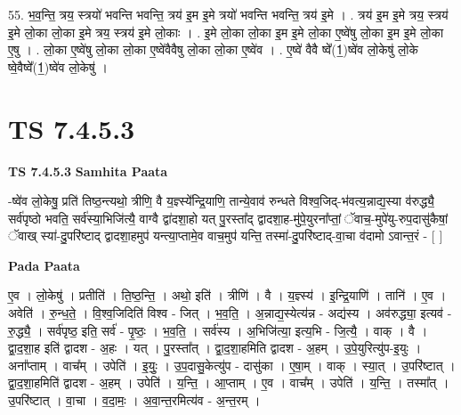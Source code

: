 \documentclass[17pt]{extarticle}
\begin{document}
55. भ॒व॒न्ति॒ त्रय॒ स्त्रयो॑ भवन्ति भवन्ति॒ त्रय॑ इ॒म इ॒मे त्रयो॑ भवन्ति भवन्ति॒ त्रय॑ इ॒मे । . त्रय॑ इ॒म इ॒मे त्रय॒ स्त्रय॑ इ॒मे लो॒का लो॒का इ॒मे त्रय॒ स्त्रय॑ इ॒मे लो॒काः । . इ॒मे लो॒का लो॒का इ॒म इ॒मे लो॒का ए॒ष्वे॑षु लो॒का इ॒म इ॒मे लो॒का ए॒षु । . लो॒का ए॒ष्वे॑षु लो॒का लो॒का ए॒ष्वे॑वैवैषु लो॒का लो॒का ए॒ष्वे॑व । . ए॒ष्वे॑ वैवै ष्वे᳚(1॒)ष्वे॑व लो॒केषु॑ लो॒के ष्वे॒वैष्वे᳚(1॒)ष्वे॑व लो॒केषु॑ । \newline
\pagebreak
{}

\section{ TS 7.4.5.3 }

\textbf{TS 7.4.5.3 } \newline
\textbf{Samhita Paata} \newline

-ष्वे॑व लो॒केषु॒ प्रति॑ तिष्ठ॒न्त्यथो॒ त्रीणि॒ वै य॒ज्ञ्स्ये᳚न्द्रि॒याणि॒ तान्ये॒वाव॑ रुन्धते विश्व॒जिद्-भ॑वत्य॒न्नाद्य॒स्या व॑रुद्ध्यै॒ सर्व॑पृष्ठो भवति॒ सर्व॑स्या॒भिजि॑त्यै॒ वाग्वै द्वा॑दशा॒हो यत् पु॒रस्ता᳚द् द्वादशा॒ह-मु॑पे॒युरना᳚प्तां॒ ॅवाच॒-मुपे॑यु-रुप॒दासु॑कैषां॒ ॅवाख् स्या॑-दु॒परि॑ष्टाद् द्वादशा॒हमुप॑ यन्त्या॒प्तामे॒व वाच॒मुप॑ यन्ति॒ तस्मा॑-दु॒परि॑ष्टाद्-वा॒चा व॑दामो ऽवान्त॒रं - [  ] \newline

\textbf{Pada Paata} \newline

ए॒व । लो॒केषु॑ । प्रतीति॑ । ति॒ष्ठ॒न्ति॒ । अथो॒ इति॑ । त्रीणि॑ । वै । य॒ज्ञ्स्य॑ । इ॒न्द्रि॒याणि॑ । तानि॑ । ए॒व । अवेति॑ । रु॒न्ध॒ते॒ । वि॒श्व॒जिदिति॑ विश्व - जित् । भ॒व॒ति॒ । अ॒न्नाद्य॒स्येत्य॑न्न - अद्य॑स्य । अव॑रुद्ध्या॒ इत्यव॑ - रु॒द्ध्यै॒ । सर्व॑पृष्ठ॒ इति॒ सर्व॑ - पृ॒ष्ठः॒ । भ॒व॒ति॒ । सर्व॑स्य । अ॒भिजि॑त्या॒ इत्य॒भि - जि॒त्यै॒ । वाक् । वै । द्वा॒द॒शा॒ह इति॑ द्वादश - अ॒हः । यत् । पु॒रस्ता᳚त् । द्वा॒द॒शा॒हमिति द्वादश - अ॒हम् । उ॒पे॒युरित्यु॑प-इ॒युः । अना᳚प्ताम् । वाच᳚म् । उपेति॑ । इ॒युः॒ । उ॒प॒दासु॒केत्यु॑प - दासु॑का । ए॒षा॒म् । वाक् । स्या॒त् । उ॒परि॑ष्टात् । द्वा॒द॒शा॒हमिति॑ द्वादश - अ॒हम् । उपेति॑ । य॒न्ति॒ । आ॒प्ताम् । ए॒व । वाच᳚म् । उपेति॑ । य॒न्ति॒ । तस्मा᳚त् । उ॒परि॑ष्टात् । वा॒चा । व॒दा॒मः॒ । अ॒वा॒न्त॒रमित्य॑व - अ॒न्त॒रम् ।  \newline
\end{document}
